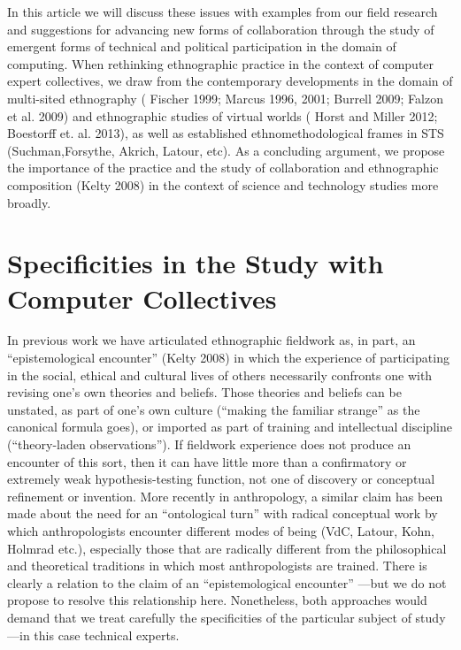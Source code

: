 \documentclass[10pt,letter,oneside]{scrartcl}
\begin{document}
In this article we will discuss these issues with examples from our
field research and suggestions for advancing new forms of
collaboration through the study of emergent forms of technical and
political participation in the domain of computing.  When rethinking
ethnographic practice in the context of computer expert collectives,
we draw from the contemporary developments in the domain of
multi-sited ethnography (\cite{Fischer1999,Marcus1995,Burrell2009}
Fischer 1999; Marcus 1996, 2001; Burrell 2009; Falzon et al. 2009) and 
ethnographic studies of virtual worlds (\cite{BOELLSTORFF2008,Miller2001} 
Horst and Miller 2012; Boestorff et. al. 2013), as well as established 
ethnomethodological frames in STS (Suchman,Forsythe, Akrich, Latour, etc).
As a concluding argument, we propose the importance of the practice and the 
study of collaboration and ethnographic composition (Kelty 2008) in the 
context of science and technology studies more broadly.


\section{Specificities in the Study with Computer Collectives}

In previous work we have articulated ethnographic fieldwork as, in
part, an ``epistemological encounter'' (Kelty 2008) in which the
experience of participating in the social, ethical and cultural lives
of others necessarily confronts one with revising one's own theories
and beliefs.  Those theories and beliefs can be unstated, as part of
one's own culture (``making the familiar strange'' as the canonical
formula goes), or imported as part of training and intellectual discipline 
(``theory-laden observations'').  If fieldwork experience does not produce 
an encounter of this sort, then it can have little more than a
confirmatory or extremely weak hypothesis-testing function, not one of
discovery or conceptual refinement or invention.  More recently in
anthropology, a similar claim has been made about the need for an
``ontological turn'' with radical conceptual work by which anthropologists 
encounter different modes of being (VdC, Latour, Kohn, Holmrad etc.), 
especially those that are radically different from the philosophical 
and theoretical traditions in which most anthropologists are trained.  
There is clearly a relation to the claim of an ``epistemological encounter''
---but we do not propose to resolve this relationship here.  Nonetheless, 
both approaches would demand that we treat carefully the specificities 
of the particular subject of study---in this case technical experts.
\end{document}
